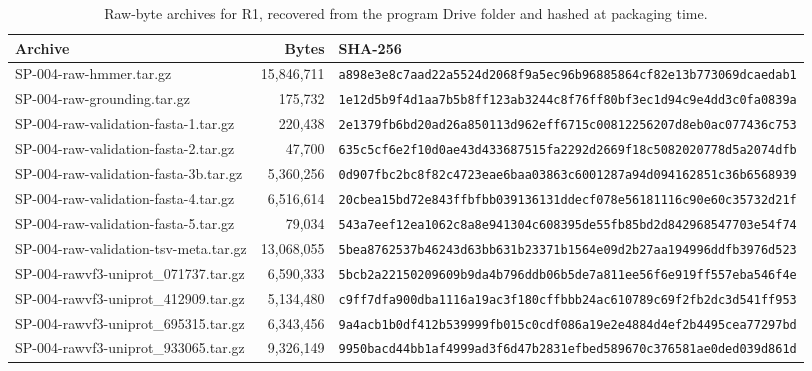 \documentclass[11pt]{article}
\begin{document}
\begin{table}[h]
\centering\footnotesize
{}
\begin{tabular}{|p{6.9cm}|r|p{6.3cm}|}
\hline
\rowcolor{lightnavy}\textbf{Archive} & \textbf{Bytes} & \textbf{SHA-256} \\\hline
SP-004-raw-hmmer.tar.gz & 15,846,711 & \texttt{a898e3e8c7aad22a5524d2068f9a\discretionary{}{}{}5ec96b96885864cf82e13b773069dcaedab1} \\\hline
SP-004-raw-grounding.tar.gz & 175,732 & \texttt{1e12d5b9f4d1aa7b5b8ff123ab3244\discretionary{}{}{}c8f76ff80bf3ec1d94c9e4dd3c0fa0839a} \\\hline
SP-004-raw-validation-fasta-1.tar.gz & 220,438 & \texttt{2e1379fb6bd20ad26a850113d962ef\discretionary{}{}{}f6715c00812256207d8eb0ac077436c753} \\\hline
SP-004-raw-validation-fasta-2.tar.gz & 47,700 & \texttt{635c5cf6e2f10d0ae43d433687515f\discretionary{}{}{}a2292d2669f18c5082020778d5a2074dfb} \\\hline
SP-004-raw-validation-fasta-3b.tar.gz & 5,360,256 & \texttt{0d907fbc2bc8f82c4723eae6baa038\discretionary{}{}{}63c6001287a94d094162851c36b6568939} \\\hline
SP-004-raw-validation-fasta-4.tar.gz & 6,516,614 & \texttt{20cbea15bd72e843ffbfbb03913613\discretionary{}{}{}1ddecf078e56181116c90e60c35732d21f} \\\hline
SP-004-raw-validation-fasta-5.tar.gz & 79,034 & \texttt{543a7eef12ea1062c8a8e941304c60\discretionary{}{}{}8395de55fb85bd2d842968547703e54f74} \\\hline
SP-004-raw-validation-tsv-meta.tar.gz & 13,068,055 & \texttt{5bea8762537b46243d63bb631b2337\discretionary{}{}{}1b1564e09d2b27aa194996ddfb3976d523} \\\hline
SP-004-rawvf3-uniprot\_071737.tar.gz & 6,590,333 & \texttt{5bcb2a22150209609b9da4b796ddb0\discretionary{}{}{}6b5de7a811ee56f6e919ff557eba546f4e} \\\hline
SP-004-rawvf3-uniprot\_412909.tar.gz & 5,134,480 & \texttt{c9ff7dfa900dba1116a19ac3f180cf\discretionary{}{}{}fbbb24ac610789c69f2fb2dc3d541ff953} \\\hline
SP-004-rawvf3-uniprot\_695315.tar.gz & 6,343,456 & \texttt{9a4acb1b0df412b539999fb015c0c\discretionary{}{}{}df086a19e2e4884d4ef2b4495cea77297bd} \\\hline
SP-004-rawvf3-uniprot\_933065.tar.gz & 9,326,149 & \texttt{9950bacd44bb1af4999ad3f6d47b28\discretionary{}{}{}31efbed589670c376581ae0ded039d861d} \\\hline
\end{tabular}
\caption{Raw-byte archives for R1, recovered from the program Drive folder and hashed at packaging time.}
\end{table}
\end{document}
